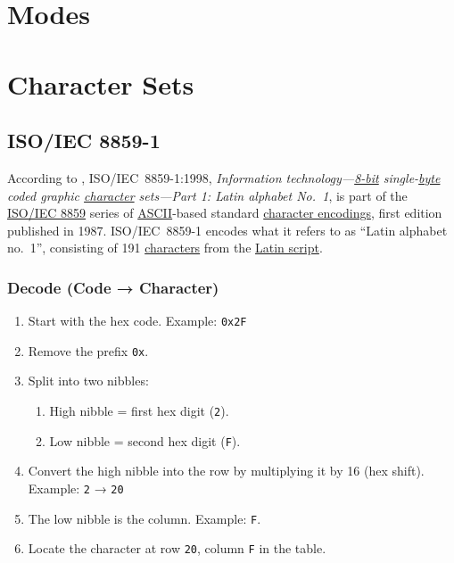 \documentclass[../../2_codex]{subfiles}
\begin{document}
\section{Modes}

\section{Character Sets}

\subsection{ISO/IEC 8859-1}

According to \textcite{wikipedia-ISO-8859-1}, ISO/IEC~8859-1:1998, \emph{Information technology---\href{https://en.wikipedia.org/wiki/8-bit_computing}{8-bit} single-\href{https://en.wikipedia.org/wiki/Byte}{byte} coded graphic \href{https://en.wikipedia.org/wiki/Character_(computing)}{character} sets---Part 1: Latin alphabet No.~1}, is part of the \href{https://en.wikipedia.org/wiki/ISO/IEC_8859}{ISO/IEC 8859} series of \href{https://en.wikipedia.org/wiki/ASCII}{ASCII}-based standard \href{https://en.wikipedia.org/wiki/Character_encoding}{character encodings}, first edition published in 1987. ISO/IEC~8859-1 encodes what it refers to as ``Latin alphabet no.~1'', consisting of 191 \href{https://en.wikipedia.org/wiki/Character_(computing)}{characters} from the \href{https://en.wikipedia.org/wiki/Latin_script}{Latin script}.


\subsubsection{Decode (Code → Character)}

\begin{enumerate}
    \item Start with the hex code. Example: \texttt{0x2F}
    \item Remove the prefix \texttt{0x}.
    \item Split into two nibbles:
    \begin{enumerate}[label=\alph*.]
        \item High nibble = first hex digit (\texttt{2}).
        \item Low nibble = second hex digit (\texttt{F}).
    \end{enumerate}
    \item Convert the high nibble into the row by multiplying it by 16 (hex shift). Example: \texttt{2} → \texttt{20}
    \item The low nibble is the column. Example: \texttt{F}.
    \item Locate the character at row \texttt{20}, column \texttt{F} in the table.
\end{enumerate}
\end{document}
